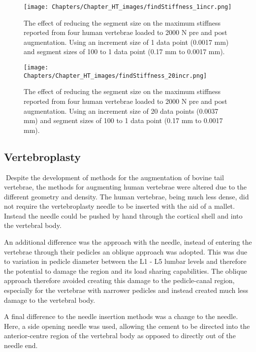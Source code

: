 \begin{figure}[ht!]
\centering
\texttt{[image: Chapters/Chapter\_HT\_images/findStiffness\_1incr.png]}
\caption{The effect of reducing the segment size on the maximum stiffness reported from four human vertebrae loaded to 2000 N pre and post augmentation. Using an increment size of 1 data point (0.0017 mm) and segment sizes of 100 to 1 data point (0.17 mm to 0.0017 mm).}
\label{fig:exp_flowchart}
\end{figure}

\begin{figure}[ht!]
\centering
\texttt{[image: Chapters/Chapter\_HT\_images/findStiffness\_20incr.png]}
\caption{The effect of reducing the segment size on the maximum stiffness reported from four human vertebrae loaded to 2000 N pre and post augmentation. Using an increment size of 20 data points (0.0037 mm) and segment sizes of 100 to 1 data point (0.17 mm to 0.0017 mm).}
\label{fig:exp_flowchart}
\end{figure}

\subsection{Vertebroplasty}

Despite the development of methods for the augmentation of bovine tail vertebrae, the methods for augmenting human vertebrae were altered due to the different geometry and density.
The human vertebrae, being much less dense, did not require the vertebroplasty needle to be inserted with the aid of a mallet.
Instead the needle could be pushed by hand through the cortical shell and into the vertebral body.

An additional difference was the approach with the needle, instead of entering the vertebrae through their pedicles an oblique approach was adopted.
This was due to variation in pedicle diameter between the L1 - L5 lumbar levels and therefore the potential to damage the region and its load sharing capabilities.
The oblique approach therefore avoided creating this damage to the pedicle-canal region, especially for the vertebrae with narrower pedicles and instead created much less damage to the vertebral body.

A final difference to the needle insertion methods was a change to the needle.
Here, a side opening needle was used, allowing the cement to be directed into the anterior-centre region of the vertebral body as opposed to directly out of the needle end.

